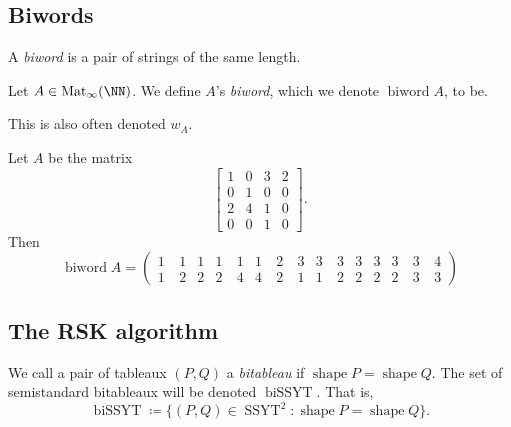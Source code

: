 \documentclass{article}
\DeclareMathOperator{\shape}{shape}
\DeclareMathOperator{\SSYT}{SSYT}
\DeclareMathOperator{\biSSYT}{biSSYT}
\DeclareMathOperator{\Mat}{Mat}
\DeclareMathOperator{\biword}{biword}
\begin{document}
\iffalse
\subsection{Biwords}

\begin{definition}
    A \textit{biword} is a pair of strings of the same length.
\end{definition}

\begin{definition}
    Let $A \in \Mat_\infty(\NN)$.
    We define $A$'s \textit{biword}, which we denote $\biword A$, to be.

    This is also often denoted $w_A$.
\end{definition}

\begin{example}
    Let $A$ be the matrix
    \[
        \begin{bmatrix}
            1 & 0 & 3 & 2 \\
            0 & 1 & 0 & 0 \\
            2 & 4 & 1 & 0 \\
            0 & 0 & 1 & 0
        \end{bmatrix}.
    \]
    Then 
    \[
        \biword A = \begin{pmatrix}
            1 & 1 & 1 & 1 & 1 & 1 \
              & 2 \
              & 3 & 3 & 3 & 3 & 3 & 3 & 3\
              & 4 \\
            1 \
              & 2 & 2 & 2 \
              & 4 & 4 \
              & 2 \
              & 1 & 1 \
              & 2 & 2 & 2 & 2 \
              & 3 \
              & 3
        \end{pmatrix}
    \]
\end{example}

\subsection{The RSK algorithm}

\begin{definition}
    We call a pair of tableaux $(P,Q)$ a \textit{bitableau} if $\shape P = \shape Q$.
    The set of semistandard bitableaux will be denoted $\biSSYT$.
    That is,
    \[
        \biSSYT \coloneq \{(P,Q) \in \SSYT^2 : \shape P = \shape Q\}.
    \]
\end{definition}
\end{document}
